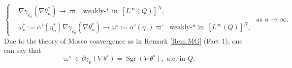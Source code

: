 \documentclass{sinst}
\numberwithin{equation}{section}
\theoremstyle{plain}
\theoremstyle{definition}
\def\Sgn{\mathop{\mathrm{Sgr}}\nolimits}
\begin{document}
\begin{equation}
  \left\{ \begin{aligned}
    &\nabla \gamma_{\varepsilon_n}(\nabla \theta_n^*) \to \varpi^\circ \mbox{ weakly-$*$ in } [L^\infty(Q)]^N,
    \\
    &\omega_n^* := \alpha'(\eta_n^*) \nabla \gamma_{\varepsilon_n}(\nabla \theta_n^*) \to \omega^\circ := \alpha'(\eta^\circ) \varpi^\circ \mbox{ weakly-$*$ in } [L^\infty(Q)]^N,
  \end{aligned} \right. \mbox{ as } n \to \infty. \label{NC0_04}
\end{equation}
Due to the theory of Mosco convergence as in Remark \ref{Rem.MG} (Fact 1), one can say that
\begin{equation}
  \varpi^\circ \in \partial \gamma_0(\nabla \theta^\circ) = \Sgn(\nabla \theta^\circ), \mbox{ a.e. in } Q. \label{NC0_05}
\end{equation}
\end{document}
